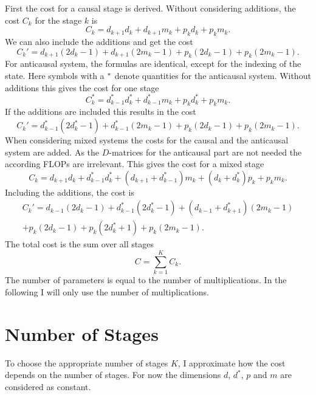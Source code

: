 \documentclass[numbers=noenddot,doctype=mastersthesis,BCOR=15mm,biblatex]{ldvbook}%
\newcommand{\da}{d^*} %
\begin{document}
First the cost for a causal stage is derived.
Without considering additions, the cost $C_k$ for the stage $k$ is 
\begin{equation}
	C_k = d_{k+1}d_k + d_{k+1}m_k+p_kd_k+p_km_k
	.
\end{equation}
We can also include the additions and get the cost
 \begin{equation}
 	C_k' = d_{k+1}(2d_k-1) + d_{k+1}(2m_k-1)+p_k(2d_k-1)+p_k(2m_k-1)
 	.
 \end{equation}
For anticausal system, the formulas are identical, except for the indexing of the state.
Here symbols with a $\vphantom{d}^*$ denote quantities for the anticausal system.
Without additions this gives the cost for one stage
\begin{equation}
C^{*}_k = \da_{k-1}\da_k + \da_{k-1}m_k+p_k \da_k+p_km_k
.
\end{equation}
If the additions are included this results in the cost
\begin{equation}
C_k' = \da_{k-1}(2\da_k-1) + \da_{k-1}(2m_k-1)+p_k(2d_k-1)+p_k(2m_k-1).
\end{equation}
When considering mixed systems the costs for the causal and the anticausal system are added.
As the $D$-matrices for the anticausal part are not needed the according FLOPs are irrelevant.
This gives the cost for a mixed stage
\begin{equation}\label{eq:cost_mixed}
C_k = d_{k+1}d_k + \da_{k-1}\da_k + (d_{k+1}+\da_{k-1})m_k +(d_k+\da_k)p_k +p_km_k 
.
\end{equation}
Including the additions, the cost is
\begin{multline}
C_k' = d_{k-1}(2d_k-1)+ \da_{k-1}(2\da_k-1) 
+ (d_{k-1}+\da_{k+1})(2m_k-1)\\
+p_k(2d_k-1)+p_k(2\da_k+1)+p_k(2m_k-1)
.
\end{multline}
The total cost is the sum over all stages
\begin{equation}\label{eq:cost_total}
C = \sum_{k=1}^K C_k
.
\end{equation}
The number of parameters is equal to the number of multiplications.
In the following I will only use the number of multiplications.

\section{Number of Stages}\label{sec:Choose_K}
To choose the appropriate number of stages $K$, I approximate how the cost depends on the number of stages.
For now the dimensions $d$, $\da$, $p$ and $m$ are considered as constant.
\end{document}
